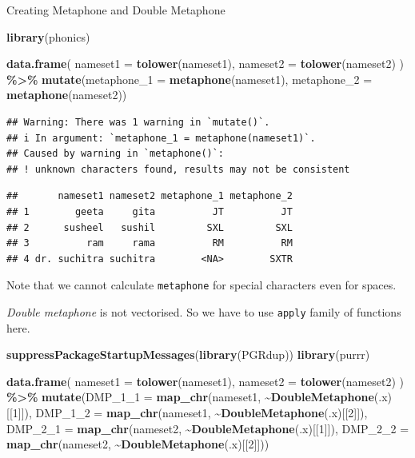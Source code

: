 \documentclass[
]{book}
\newenvironment{Shaded}{\begin{snugshade}}{\end{snugshade}}
\newcommand{\AttributeTok}[1]{\textcolor[rgb]{0.13,0.29,0.53}{#1}}
\newcommand{\DecValTok}[1]{\textcolor[rgb]{0.00,0.00,0.81}{#1}}
\newcommand{\FunctionTok}[1]{\textcolor[rgb]{0.13,0.29,0.53}{\textbf{#1}}}
\newcommand{\NormalTok}[1]{#1}
\newcommand{\SpecialCharTok}[1]{\textcolor[rgb]{0.81,0.36,0.00}{\textbf{#1}}}
\begin{document}
Creating Metaphone and Double Metaphone

\begin{Shaded}
\begin{Highlighting}[]
\FunctionTok{library}\NormalTok{(phonics)}

\FunctionTok{data.frame}\NormalTok{(}
  \AttributeTok{nameset1 =} \FunctionTok{tolower}\NormalTok{(nameset1),}
  \AttributeTok{nameset2 =} \FunctionTok{tolower}\NormalTok{(nameset2)}
\NormalTok{) }\SpecialCharTok{\%\textgreater{}\%} 
  \FunctionTok{mutate}\NormalTok{(}\AttributeTok{metaphone\_1 =} \FunctionTok{metaphone}\NormalTok{(nameset1),}
         \AttributeTok{metaphone\_2 =} \FunctionTok{metaphone}\NormalTok{(nameset2))}
\end{Highlighting}
\end{Shaded}

\begin{verbatim}
## Warning: There was 1 warning in `mutate()`.
## i In argument: `metaphone_1 = metaphone(nameset1)`.
## Caused by warning in `metaphone()`:
## ! unknown characters found, results may not be consistent
\end{verbatim}

\begin{verbatim}
##       nameset1 nameset2 metaphone_1 metaphone_2
## 1        geeta     gita          JT          JT
## 2      susheel   sushil         SXL         SXL
## 3          ram     rama          RM          RM
## 4 dr. suchitra suchitra        <NA>        SXTR
\end{verbatim}

Note that we cannot calculate \texttt{metaphone} for special characters even for spaces.

\emph{Double metaphone} is not vectorised. So we have to use \texttt{apply} family of functions here.

\begin{Shaded}
\begin{Highlighting}[]
\FunctionTok{suppressPackageStartupMessages}\NormalTok{(}\FunctionTok{library}\NormalTok{(PGRdup))}
\FunctionTok{library}\NormalTok{(purrr)}

\FunctionTok{data.frame}\NormalTok{(}
  \AttributeTok{nameset1 =} \FunctionTok{tolower}\NormalTok{(nameset1),}
  \AttributeTok{nameset2 =} \FunctionTok{tolower}\NormalTok{(nameset2)}
\NormalTok{) }\SpecialCharTok{\%\textgreater{}\%} 
  \FunctionTok{mutate}\NormalTok{(}\AttributeTok{DMP\_1\_1 =} \FunctionTok{map\_chr}\NormalTok{(nameset1, }\SpecialCharTok{\textasciitilde{}}\FunctionTok{DoubleMetaphone}\NormalTok{(.x)[[}\DecValTok{1}\NormalTok{]]),}
         \AttributeTok{DMP\_1\_2 =} \FunctionTok{map\_chr}\NormalTok{(nameset1, }\SpecialCharTok{\textasciitilde{}}\FunctionTok{DoubleMetaphone}\NormalTok{(.x)[[}\DecValTok{2}\NormalTok{]]),}
         \AttributeTok{DMP\_2\_1 =} \FunctionTok{map\_chr}\NormalTok{(nameset2, }\SpecialCharTok{\textasciitilde{}}\FunctionTok{DoubleMetaphone}\NormalTok{(.x)[[}\DecValTok{1}\NormalTok{]]),}
         \AttributeTok{DMP\_2\_2 =} \FunctionTok{map\_chr}\NormalTok{(nameset2, }\SpecialCharTok{\textasciitilde{}}\FunctionTok{DoubleMetaphone}\NormalTok{(.x)[[}\DecValTok{2}\NormalTok{]]))}
\end{Highlighting}
\end{Shaded}
\end{document}
